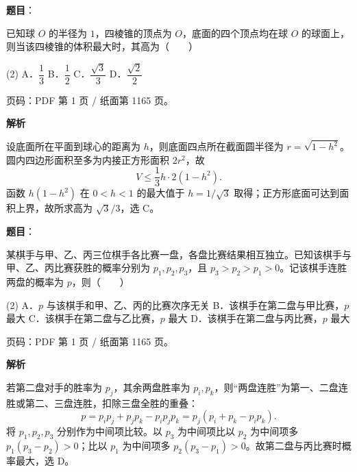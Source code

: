 \begin{answer}

\textbf{题目}：

已知球 $O$ 的半径为 $1$，四棱锥的顶点为 $O$，底面的四个顶点均在球 $O$ 的球面上，则当该四棱锥的体积最大时，其高为\mbox{（　　）}

\begin{gkopts}(2)
\task A．$\dfrac13$
\task B．$\dfrac12$
\task C．$\dfrac{\sqrt3}{3}$
\task D．$\dfrac{\sqrt2}{2}$
\end{gkopts}

\begin{gktip}
页码：PDF 第 1 页 / 纸面第 1165 页。
\end{gktip}

\textbf{解析}

设底面所在平面到球心的距离为 $h$，则底面四点所在截面圆半径为 $r=\sqrt{1-h^2}$。圆内四边形面积至多为内接正方形面积 $2r^2$，故
\nopagebreak[4]
\[
V\le\frac13h\cdot2(1-h^2).
\]
函数 $h(1-h^2)$ 在 $0<h<1$ 的最大值于 $h=1/\sqrt3$ 取得；正方形底面可达到面积上界，故所求高为 $\sqrt3/3$，选 C。


\end{answer}
\begin{answer}

\textbf{题目}：

某棋手与甲、乙、丙三位棋手各比赛一盘，各盘比赛结果相互独立。已知该棋手与甲、乙、丙比赛获胜的概率分别为 $p_1,p_2,p_3$，且 $p_3>p_2>p_1>0$。记该棋手连胜两盘的概率为 $p$，则\mbox{（　　）}

\begin{gkopts}(2)
\task A．$p$ 与该棋手和甲、乙、丙的比赛次序无关
\task B．该棋手在第二盘与甲比赛，$p$ 最大
\task C．该棋手在第二盘与乙比赛，$p$ 最大
\task D．该棋手在第二盘与丙比赛，$p$ 最大
\end{gkopts}

\begin{gktip}
页码：PDF 第 1 页 / 纸面第 1165 页。
\end{gktip}

\textbf{解析}

若第二盘对手的胜率为 $p_j$，其余两盘胜率为 $p_i,p_k$，则“两盘连胜”为第一、二盘连胜或第二、三盘连胜，扣除三盘全胜的重叠：
\nopagebreak[4]
\[
p=p_ip_j+p_jp_k-p_ip_jp_k=p_j(p_i+p_k-p_ip_k).
\]
将 $p_1,p_2,p_3$ 分别作为中间项比较。以 $p_3$ 为中间项比以 $p_2$ 为中间项多 $p_1(p_3-p_2)>0$；比以 $p_1$ 为中间项多 $p_2(p_3-p_1)>0$。故第二盘与丙比赛时概率最大，选 D。


\end{answer}
